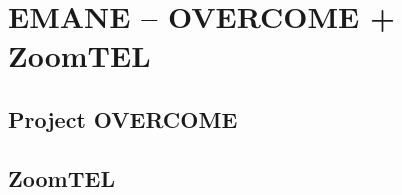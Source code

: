\chapter{EMANE -- OVERCOME + ZoomTEL}
\label{chapter3}


\section{Project OVERCOME}


\section{ZoomTEL}

